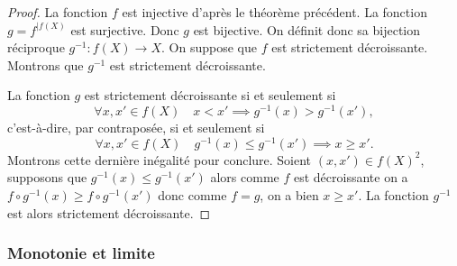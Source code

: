 \begin{proof}
  La fonction \(f\) est injective d'après le théorème précédent. La fonction
  \(g=f^{|f(X)}\) est surjective. Donc \(g\) est bijective. On définit donc sa
  bijection réciproque \(g^{-1}:f(X) \longrightarrow X\). On suppose que \(f\)
  est strictement décroissante. Montrons que \(g^{-1}\) est strictement
  décroissante.

  La fonction \(g\) est strictement décroissante si et seulement si
  \begin{equation}
    \forall x,x' \in f(X) \quad x < x' \implies g^{-1}(x) > g^{-1}(x') ,
  \end{equation}
  c'est-à-dire, par contraposée, si et seulement si \begin{equation}
    \forall x,x' \in f(X) \quad  g^{-1}(x) \leqslant g^{-1}(x') \implies x
    \geqslant x'.
  \end{equation}
  Montrons cette dernière inégalité pour conclure. Soient \((x, x') \in
  f(X)^2\), supposons que \(g^{-1}(x) \leqslant g^{-1}(x')\) alors comme \(f\)
  est décroissante on a \(f \circ g^{-1}(x) \geqslant f \circ g^{-1}(x')\) donc
  comme \(f=g\), on a bien \(x \geqslant x'\). La fonction \(g^{-1}\) est alors
  strictement décroissante.
\end{proof}

\subsubsection{Monotonie et limite}

